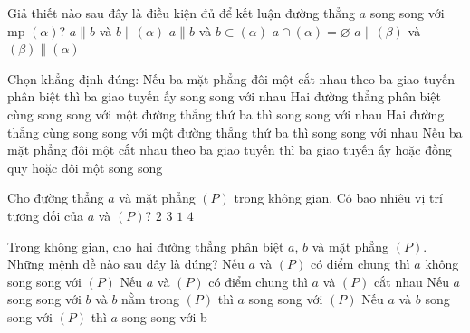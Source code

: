 \begin{ex}%
	Giả thiết nào sau đây  là điều kiện đủ để kết luận đường thẳng $a$ song song với mp $(\alpha)$?
	 \choice
		 {$a \parallel b$ và $b \parallel (\alpha)$}
		{$a \parallel b$ và $b\subset  (\alpha)$}
		{\True $a\cap (\alpha)=\varnothing$} 
		{$a \parallel \left(\beta  \right)$ và $\left(\beta \right) \parallel \left(\alpha \right)$}
\end{ex}

\begin{ex}%
	Chọn  khẳng định đúng:
	 \choice
		{Nếu ba mặt phẳng đôi một cắt  nhau theo ba giao tuyến phân biệt thì ba giao tuyến ấy song song với nhau}
		{\True Hai  đường thẳng phân biệt cùng song song với một đường thẳng thứ ba thì song song với nhau}
		{Hai đường thẳng cùng  song song với một đường thẳng thứ ba thì song song với nhau}
		{Nếu ba mặt phẳng đôi một  cắt nhau theo ba giao tuyến thì ba giao tuyến ấy hoặc đồng quy hoặc đôi một song song}
\end{ex}

\begin{ex}%
	Cho đường thẳng $ a$ và mặt phẳng $( P)$ trong không gian. Có bao nhiêu vị  trí tương đối của $ a$ và $( P)$?
	 \choice
		{$2$} 
		{\True  $3$}
		 {$1$}
		{$4$} 
\end{ex}

\begin{ex}%
	Trong không gian, cho hai đường thẳng phân biệt  $ a$, $ b$ và mặt phẳng $( P)$. Những mệnh đề nào sau đây là đúng?
	\choice 
		{\True Nếu $  a$ và $( P)$ có điểm chung thì $ a$ không song song với $( P)$}
		{Nếu $ a$ và  $( P)$ có điểm chung thì $ a$ và $( P)$ cắt nhau}
		{Nếu $ a$ song song với $ b$ và $  b$ nằm trong $( P)$ thì $ a$ song song với $( P)$}
		{Nếu $ a$ và $ b$ song song với  $( P)$ thì $ a$ song song với b}
\end{ex}

